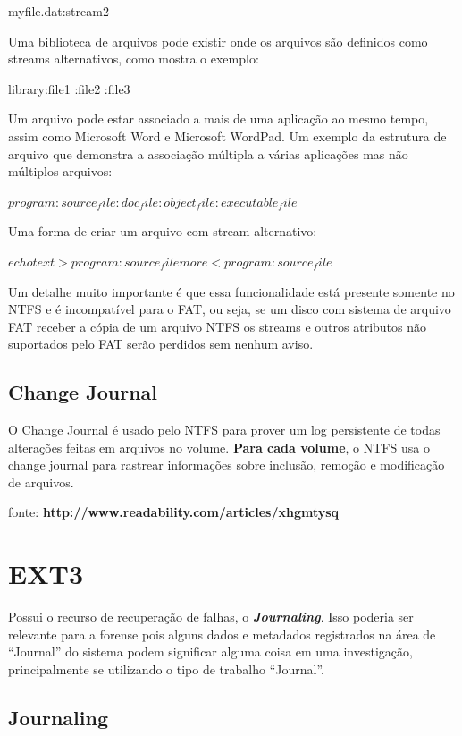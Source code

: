 {
\raggedright
myfile.dat:stream2
}

Uma biblioteca de arquivos pode existir onde os arquivos são definidos como streams alternativos, como mostra o exemplo:

{
\raggedright
library:file1
:file2
:file3
}

Um arquivo pode estar associado a mais de uma aplicação ao mesmo tempo, assim como  Microsoft Word e Microsoft WordPad. Um exemplo da estrutura de arquivo que demonstra a associação múltipla a várias aplicações mas não múltiplos arquivos:

{
\raggedright
$
program:source_file
:doc_file
:object_file
:executable_file
$
}

Uma forma de criar um arquivo com stream alternativo:

{
\raggedright
$
echo text > program:source_file
more < program:source_file
$
}

\begin{citacao}
Um detalhe muito importante é que essa funcionalidade está presente somente no NTFS e é incompatível para o FAT, ou seja, se um disco com sistema de arquivo FAT receber a cópia de um arquivo NTFS os streams e outros atributos não suportados pelo FAT serão perdidos sem nenhum aviso.
\end{citacao}

\subsection{Change Journal}

O Change Journal é usado pelo NTFS para prover um log persistente de todas alterações feitas em arquivos no volume. \textbf{Para cada volume}, o NTFS usa o change journal para rastrear informações sobre inclusão, remoção e modificação de arquivos.

fonte: \textbf{http://www.readability.com/articles/xhgmtysq}

\section{EXT3}

Possui o recurso de recuperação de falhas, o \emph{\textbf{Journaling}}. Isso poderia ser relevante para a forense pois alguns dados e metadados registrados na área de ``Journal'' do sistema podem significar alguma coisa em uma investigação, principalmente se utilizando o tipo de trabalho ``Journal''.

\subsection{Journaling}

